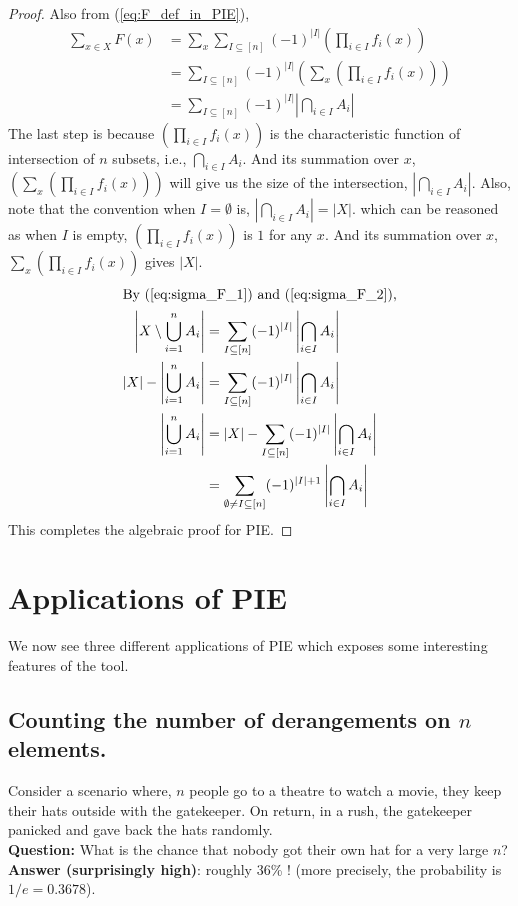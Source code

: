 \begin{proof}
Also from (\ref{eq:F_def_in_PIE}),
\begin{align}
\sum_{x \in X} F(x)&= \sum_{x} \sum_{I \subseteq [n]} (-1)^{|I|} \left(\prod_{i \in I} f_i(x)\right)\nonumber \\
&= \sum_{I \subseteq [n]} (-1)^{|I|} \left(\sum_{x} \left(\prod_{i \in I} f_i(x)\right)\right)\nonumber \\
&=\sum_{I \subseteq [n]} (-1)^{|I|} \left|\bigcap_{i \in I}A_i\right|\label{eq:sigma_F_2}
\end{align}
The last step is because $(\prod_{i \in I} f_i(x))$ is the characteristic function of intersection of $n$ subsets, i.e., $\bigcap_{i \in I}A_i$. And its summation over $x$, $(\sum_{x} (\prod_{i \in I} f_i(x)))$ will give us the size of the intersection, $\left|\bigcap_{i \in I}A_i\right|$. Also, note that the convention when $I=\emptyset$ is,
$\left|\bigcap_{i \in I}A_i\right| = |X|$.
which can be reasoned as when $I$ is empty, $\left(\prod_{i \in I} f_i(x)\right)$ is $1$ for any $x$. And its summation over $x$, $\sum_{x} \left(\prod_{i \in I} f_i(x)\right)$ gives $|X|$.
\begin{align*}
\intertext{By (\ref{eq:sigma_F_1}) and (\ref{eq:sigma_F_2}),}
\left|X \setminus \bigcup_{i=1}^{n}A_i\right| &= \sum_{I \subseteq [n]} (-1)^{|I|} \left|\bigcap_{i \in I}A_i\right|\\
|X | - \left| \bigcup_{i=1}^{n}A_i\right| &= \sum_{I \subseteq [n]} (-1)^{|I|} \left|\bigcap_{i \in I}A_i \right|\\
\left| \bigcup_{i=1}^{n}A_i \right| &= |X| - \sum_{I \subseteq [n]} (-1)^{|I|} \left|\bigcap_{i \in I}A_i\right|\\ 
&=\sum_{\emptyset \neq I \subseteq [n]} (-1)^{|I|+1} \left|\bigcap_{i \in I}A_i \right| \\
\end{align*}
This completes the algebraic proof for PIE.
\end{proof}


\section{Applications of PIE} \label{sec:Applications of PIE - lec1}

We now see three different applications of PIE which exposes some interesting features of the tool.

\subsection{Counting the number of derangements on $n$ elements.} \label{subsec:derangements application}
Consider a scenario where, $n$ people go to a theatre to watch a movie, they keep their hats outside with the gatekeeper. On return, in a rush, the gatekeeper panicked and gave back the hats randomly.\\
\textbf{Question:} What is the chance that nobody got their own hat for a very large $n$?\\
\textbf{Answer (surprisingly high)}: roughly 36\% ! (more precisely, the probability is $1/e = 0.3678$).

